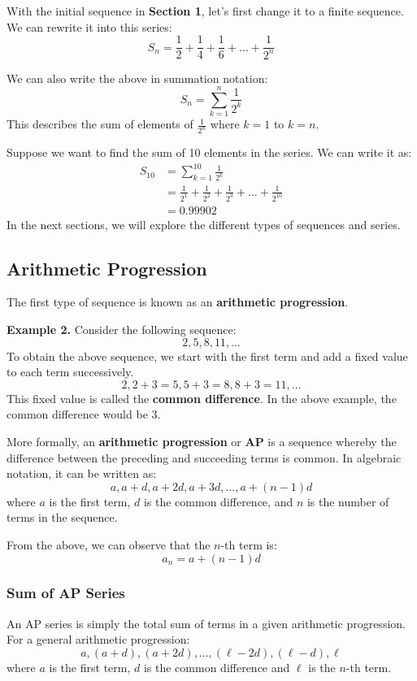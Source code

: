 \documentclass[12pt]{article}
\begin{document}
With the initial sequence in \textbf{Section 1}, let's first change it to a finite sequence. We can rewrite it into this series:
\[
	S_{n} = \frac{1}{2} + \frac{1}{4} + \frac{1}{6} + \dots + \frac{1}{2^{n}}
\]

We can also write the above in summation notation:
\[
	S_{n} = \displaystyle\sum_{k=1}^{n}\frac{1}{2^{k}}
\]
This describes the sum of elements of $\displaystyle\frac{1}{2^{n}}$ where $k=1$ to $k=n$.

Suppose we want to find the sum of 10 elements in the series. We can write it as:
\begin{align*}
	S_{10} & = \displaystyle\sum_{k=1}^{10}\frac{1}{2^{k}}                                    \\
	       & = \frac{1}{2^{1}} + \frac{1}{2^{2}} + \frac{1}{2^{3}} + \dots + \frac{1}{2^{10}} \\
	       & = 0.99902
\end{align*}
In the next sections, we will explore the different types of sequences and series.

\subsection{Arithmetic Progression}

The first type of sequence is known as an \textbf{arithmetic progression}.

\textbf{Example 2.} Consider the following sequence:
\[
	2, 5, 8, 11, \dots
\]
To obtain the above sequence, we start with the first term and add a fixed value to each term successively.
\[
	2, 2 + 3 = 5, 5 + 3 = 8, 8 + 3 = 11, \dots
\]
This fixed value is called the \textbf{common difference}. In the above example, the common difference would be 3.

More formally, an \textbf{arithmetic progression} or \textbf{AP} is a sequence whereby the difference between the preceding and succeeding terms is common.
In algebraic notation, it can be written as:
\[
	a, a + d, a + 2d, a + 3d, \dots, a + (n-1)d
\]
where $a$ is the first term, $d$ is the common difference, and $n$ is the number of terms in the sequence.

From the above, we can observe that the $n$-th term is:
\[
	a_n = a + (n-1)d
\]

\subsubsection{Sum of AP Series}

An AP series is simply the total sum of terms in a given arithmetic progression. For a general arithmetic progression:
\[
	a, (a + d), (a + 2d), \dots, (\ell - 2d), (\ell - d), \ell
\]
where $a$ is the first term, $d$ is the common difference and $\ell$ is the $n$-th term.
\end{document}
